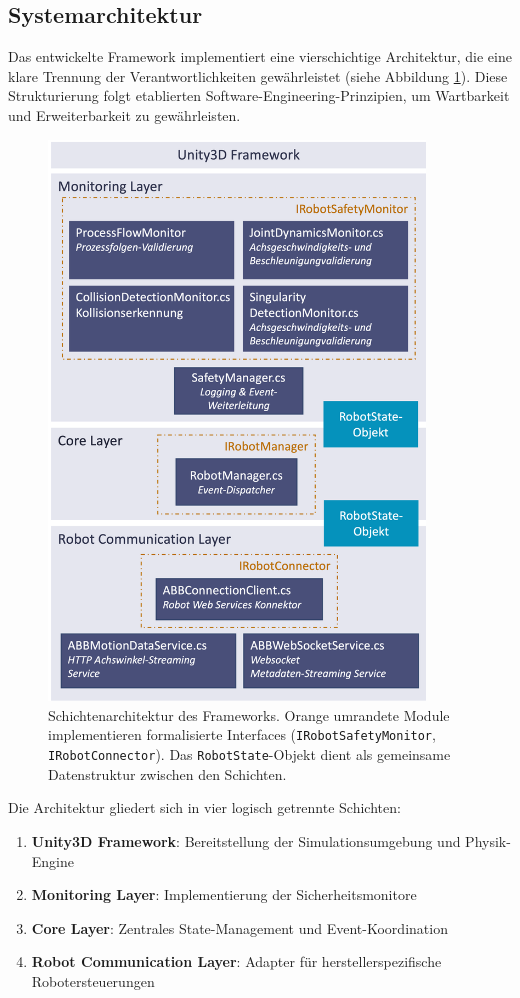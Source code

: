 \subsection{Systemarchitektur}

Das entwickelte Framework implementiert eine vierschichtige Architektur, die
eine klare Trennung der Verantwortlichkeiten gewährleistet (siehe Abbildung
\ref{fig:layer_architecture}). Diese Strukturierung folgt etablierten
Software-Engineering-Prinzipien, um Wartbarkeit und Erweiterbarkeit zu
gewährleisten.

\begin{figure}[H]
  \centering
  \includegraphics[width=10cm]{figures/LayerArchitekturFramework.png}
  \caption{Schichtenarchitektur des Frameworks. Orange umrandete
    Module implementieren formalisierte Interfaces
    (\texttt{IRobotSafetyMonitor}, \texttt{IRobotConnector}). Das
    \texttt{RobotState}-Objekt dient als gemeinsame Datenstruktur
  zwischen den Schichten.}
  \label{fig:layer_architecture}
\end{figure}

Die Architektur gliedert sich in vier logisch getrennte Schichten:

\begin{enumerate}
  \item \textbf{Unity3D Framework}: Bereitstellung der
    Simulationsumgebung und Physik-Engine
  \item \textbf{Monitoring Layer}: Implementierung der Sicherheitsmonitore
  \item \textbf{Core Layer}: Zentrales State-Management und Event-Koordination
  \item \textbf{Robot Communication Layer}: Adapter für
    herstellerspezifische Robotersteuerungen
\end{enumerate}

